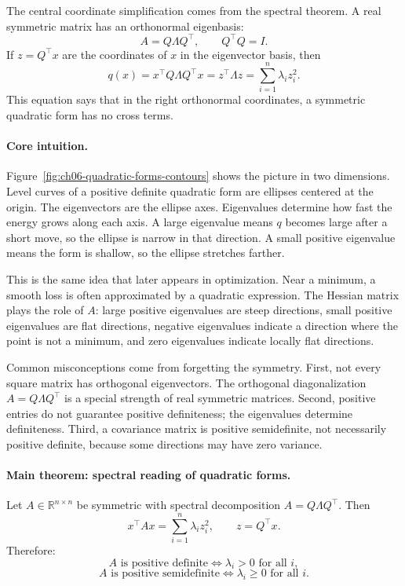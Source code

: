 The central coordinate simplification comes from the spectral theorem. A real symmetric matrix has an orthonormal eigenbasis:
\[
A=Q\Lambda Q^\top,
\qquad
Q^\top Q=I.
\]
If \(z=Q^\top x\) are the coordinates of \(x\) in the eigenvector basis, then
\[
q(x)=x^\top Q\Lambda Q^\top x
=z^\top\Lambda z
=\sum_{i=1}^n \lambda_i z_i^2.
\]
This equation says that in the right orthonormal coordinates, a symmetric quadratic form has no cross terms.

\paragraph{Core intuition.}
Figure~\ref{fig:ch06-quadratic-forms-contours} shows the picture in two dimensions. Level curves of a positive definite quadratic form are ellipses centered at the origin. The eigenvectors are the ellipse axes. Eigenvalues determine how fast the energy grows along each axis. A large eigenvalue means \(q\) becomes large after a short move, so the ellipse is narrow in that direction. A small positive eigenvalue means the form is shallow, so the ellipse stretches farther.

This is the same idea that later appears in optimization. Near a minimum, a smooth loss is often approximated by a quadratic expression. The Hessian matrix plays the role of \(A\): large positive eigenvalues are steep directions, small positive eigenvalues are flat directions, negative eigenvalues indicate a direction where the point is not a minimum, and zero eigenvalues indicate locally flat directions.

Common misconceptions come from forgetting the symmetry. First, not every square matrix has orthogonal eigenvectors. The orthogonal diagonalization \(A=Q\Lambda Q^\top\) is a special strength of real symmetric matrices. Second, positive entries do not guarantee positive definiteness; the eigenvalues determine definiteness. Third, a covariance matrix is positive semidefinite, not necessarily positive definite, because some directions may have zero variance.

\paragraph{Main theorem: spectral reading of quadratic forms.}
Let \(A\in\mathbb{R}^{n\times n}\) be symmetric with spectral decomposition \(A=Q\Lambda Q^\top\). Then
\[
x^\top A x=\sum_{i=1}^n \lambda_i z_i^2,
\qquad
z=Q^\top x.
\]
Therefore:
\[
A\text{ is positive definite}\Longleftrightarrow \lambda_i>0\text{ for all }i,
\]
\[
A\text{ is positive semidefinite}\Longleftrightarrow \lambda_i\geq 0\text{ for all }i.
\]

